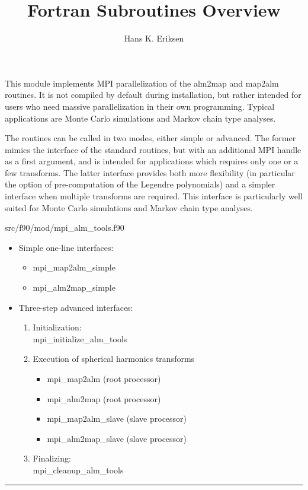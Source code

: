 
\sloppy


\title{\healpix Fortran Subroutines Overview}
 \section[mpi\_alm\_tools*]{ }
\label{sub:mpi_alm_tools}
\author{Hans K. Eriksen}

\begin{facility}
{This module implements MPI parallelization of the alm2map and map2alm routines. 
It is not compiled by default during installation, but rather intended for
users who need massive parallelization in their own programming. Typical
applications are Monte Carlo simulations and Markov chain type
analyses.

The routines can be called in two modes, either simple or
advanced. The former mimics the interface of the standard routines,
but with an additional MPI handle as a first argument, and is intended
for applications which requires only one or a few transforms. The
latter interface provides both more flexibility (in particular the
option of pre-computation of the Legendre polynomials) and a simpler
interface when multiple transforms are required. This interface is
particularly well suited for Monte Carlo simulations and Markov chain
type analyses.  } 
{src/f90/mod/mpi\_alm\_tools.f90}
\end{facility}

\begin{example}
{ 
\begin{itemize}

\item Simple one-line interfaces:
\begin{itemize}
\item mpi\_map2alm\_simple
\item mpi\_alm2map\_simple
\end{itemize}

\item Three-step advanced interfaces:
\begin{enumerate}
   \item Initialization: \\mpi\_initialize\_alm\_tools
   \item Execution of spherical harmonics transforms
   \begin{itemize}
	   \item mpi\_map2alm (root processor)
	   \item mpi\_alm2map (root processor)
	   \item mpi\_map2alm\_slave (slave processor)
	   \item mpi\_alm2map\_slave (slave processor)
    \end{itemize}
    \item Finalizing: \\ mpi\_cleanup\_alm\_tools
\end{enumerate}
\end{itemize}
}
{
}
\end{example}

\rule{\hsize}{2mm}

\newpage
